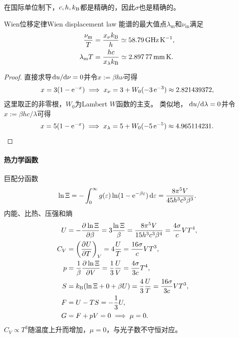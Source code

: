 \begin{remark}
	在国际单位制下，$c,h,k_{\mathrm{B}}$都是精确的，因此$\sigma$也是精确的。
\end{remark}

\begin{theorem}
	{Wien位移定律}{Wien displacement law}
	能谱的最大值点$\lambda_{\mathrm m}$和$\nu_{\mathrm m}$满足
	\begin{subequations}
		\begin{align}
			\frac{\nu_{\mathrm m}}T &= \frac{x_\nu k_{\mathrm{B}}}{h} \simeq \qty{58.79}{\giga\hertz\per\kelvin},\\
			\lambda_{\mathrm m}T &= \frac{hc}{x_\lambda k_{\mathrm{B}}} \simeq \qty{2.89777}{\milli\metre\kelvin}.
		\end{align}
	\end{subequations}
\end{theorem}

\begin{proof}
	直接求导$\mathop{}\!\mathrm{d} u/\mathrm{d}\nu = 0$并令$x := \beta h\nu$可得
	\[
		x = 3(1 - \mathop{}\!\mathrm{e}^{-x}) \implies x_\nu = 3 + W_0(-3\mathop{}\!\mathrm{e}^{-3}) \approx 2.821439372,
	\]
	这里取正的非零根，$W_0$为Lambert $W$函数的主支。
	类似地，
	$\mathop{}\!\mathrm{d} u/\mathrm{d}\lambda = 0$并令$x := \beta hc/\lambda$可得
	\[
		x = 5(1 - \mathop{}\!\mathrm{e}^{-x}) \implies x_\lambda = 5 + W_0(-5\mathop{}\!\mathrm{e}^{-5}) \approx 4.965114231.
		\qedhere
	\]
\end{proof}

\paragraph{热力学函数}

巨配分函数
\begin{equation}
	\ln\Xi = -\int_0^\infty g(\varepsilon)\ln(1 - \mathop{}\!\mathrm{e}^{-\beta\varepsilon})\mathop{}\!\mathrm{d}\varepsilon = \frac{8\pi^5V}{45h^3c^3\beta^3}.
\end{equation}
内能、比热、压强和熵
\begin{subequations}
	\begin{align}
		U &= -\frac{\partial^{}\ln\Xi}{\partial{\beta}^{}} = 3\frac{\ln\Xi}\beta = \frac{8\pi^5V}{15h^3c^3\beta^4} = \frac{4\sigma}c VT^4,\\
		C_V &= \biggl(\frac{\partial^{}U}{\partial{T}^{}}\biggr)_{V} = 4\frac UT = \frac{16\sigma}c VT^3,\\
		p &= \frac1\beta\frac{\partial^{}\ln\Xi}{\partial{V}^{}} = \frac13\frac UV = \frac{4\sigma}{3c}T^4,\\
		S &= k_{\mathrm{B}}(\ln\Xi + 0 + \beta U) = \frac43\frac UT = \frac{16\sigma}{3c}VT^3,\\
		F &= U - TS = -\frac13U,\\
		G &= F + pV = 0 \implies \mu = 0.
	\end{align}
\end{subequations}
$C_V \propto T^3$随温度上升而增加，$\mu = 0$，与光子数不守恒对应。

